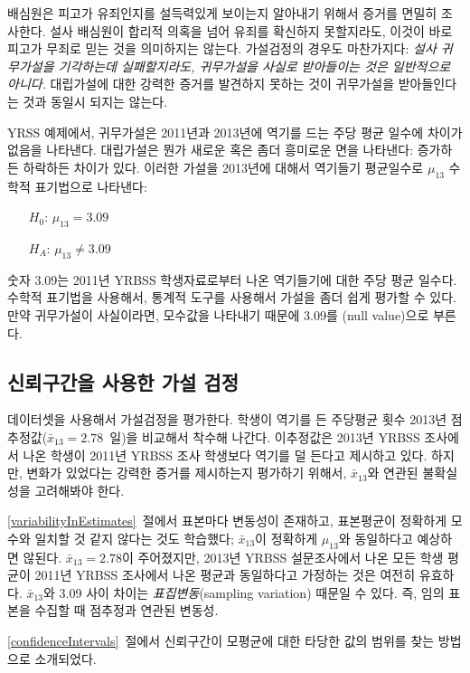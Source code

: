 배심원은 피고가 유죄인지를 설득력있게 보이는지 알아내기 위해서 증거를 면밀히 조사한다. 설사 배심원이 합리적 의혹을 넘어 유죄를 확신하지 못할지라도, 이것이 바로 피고가 무죄로 믿는 것을 의미하지는 않는다. 가설검정의 경우도 마찬가지다: \emph{설사 귀무가설을 기각하는데 실패할지라도, 귀무가설을 사실로 받아들이는 것은 일반적으로 아니다.} 대립가설에 대한 강력한 증거를 발견하지 못하는 것이 귀무가설을 받아들인다는 것과 동일시 되지는 않는다.

YRSS 예제에서, 귀무가설은 2011년과 2013년에 역기를 드는 주당 평균 일수에 차이가 없음을 나타낸다. 대립가설은 뭔가 새로운 혹은 좀더 흥미로운 면을 나타낸다: 증가하든 하락하든 차이가 있다. 이러한 가설을 2013년에 대해서 역기들기 평균일수로 $\mu_{13}$ 수학적 표기법으로 나타낸다:

\begin{itemize}
\setlength{\itemsep}{0mm}
\item[$H_0$:] $\mu_{13} = 3.09$
\item[$H_A$:] $\mu_{13} \neq 3.09$
\end{itemize}
숫자 3.09는 2011년 YRBSS 학생자료로부터 나온 역기들기에 대한 주당 평균 일수다. 수학적 표기법을 사용해서, 통계적 도구를 사용해서 가설을 좀더 쉽게 평가할 수 있다. 만약 귀무가설이 사실이라면, 모수값을 나타내기 때문에 3.09를 (null value)으로 부른다.

\subsection{신뢰구간을 사용한 가설 검정}
\label{utilizingOurCI}

 데이터셋을 사용해서 가설검정을 평가한다. 학생이 역기를 든 주당평균 횟수 2013년 점추정값($\bar{x}_{13} = 2.78$~일)을 비교해서 착수해 나간다. 이추정값은 2013년 YRBSS 조사에서 나온 학생이 2011년 YRBSS 조사 학생보다 역기를 덜 든다고 제시하고 있다. 하지만, 변화가 있었다는 강력한 증거를 제시하는지 평가하기 위해서, $\bar{x}_{13}$와 연관된 불확실성을 고려해봐야 한다.

\ref{variabilityInEstimates}~절에서 표본마다 변동성이 존재하고, 표본평균이 정확하게 모수와 일치할 것 같지 않다는 것도 학습했다; $\bar{x}_{13}$이 정확하게 $\mu_{13}$와 동일하다고 예상하면 않된다. $\bar{x}_{13} = 2.78$이 주어졌지만, 2013년 YRBSS 설문조사에서 나온 모든 학생 평균이 2011년 YRBSS 조사에서 나온 평균과 동일하다고 가정하는 것은 여전히 유효하다. $\bar{x}_{13}$와 3.09 사이 차이는 \emph{표집변동}(sampling variation) 때문일 수 있다. 즉, 임의 표본을 수집할 때 점추정과 연관된 변동성.

\ref{confidenceIntervals}~절에서 신뢰구간이 모평균에 대한 타당한 값의 범위를 찾는 방법으로 소개되었다.

